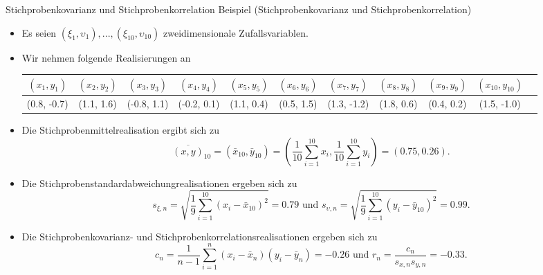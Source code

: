 \documentclass[
  8pt,
  ignorenonframetext,
]{beamer}
\newcommand{\ups}{\upsilon}
\begin{document}
\begin{frame}{Stichprobenkovarianz und Stichprobenkorrelation}
\protect\hypertarget{stichprobenkovarianz-und-stichprobenkorrelation-1}{}
Beispiel (Stichprobenkovarianz und Stichprobenkorrelation) \vspace{1mm}

\footnotesize

\begin{itemize}
\item
  Es seien \((\xi_1,\ups_1),...,(\xi_{10},\ups_{10})\) zweidimensionale
  Zufallsvariablen. \vspace{1mm}
\item
  Wir nehmen folgende Realisierungen an

  \begin{tiny}
  \begin{table}[h]
  \begin{center}
  \setlength{\tabcolsep}{2pt}
  \begin{tabular}{ccccccccccc}
   $(x_1,    y_1)$
  &  $(x_2,    y_2)$
  &  $(x_3,    y_3)$
  &  $(x_4,    y_4)$
  &  $(x_5,    y_5)$
  &  $(x_6,    y_6)$
  &  $(x_7,    y_7)$
  &  $(x_8,    y_8)$
  &  $(x_9,    y_9)$
  &  $(x_{10}, y_{10})$ \\\hline
    (0.8,  -0.7)
  &   (1.1,   1.6)
  &   (-0.8,   1.1)
  &   (-0.2,   0.1)
  &   (1.1,   0.4)
  &   (0.5,   1.5)
  &   (1.3,  -1.2)
  &   (1.8,   0.6)
  &   (0.4,   0.2)
  &   (1.5,  -1.0)
  \end{tabular}
  \end{center}
  \end{table}
  \end{tiny}
\item
  Die Stichprobenmittelrealisation ergibt sich zu \begin{equation}
  \overline{(x,y)}_{10}
  = (\bar{x}_{10},\bar{y}_{10})
  = \left(\frac{1}{10}\sum_{i = 1}^{10}x_i, \frac{1}{10}\sum_{i = 1}^{10}y_i\right)
  = (0.75, 0.26).
  \end{equation}
\item
  Die Stichprobenstandardabweichungrealisationen ergeben sich zu
  \begin{equation}
  s_{\xi,n}
  = \sqrt{\frac{1}{9}\sum_{i=1}^{10} (x_i - \bar{x}_{10})^2}
  = 0.79
  \mbox{ und }
  s_{\ups,n}
  = \sqrt{\frac{1}{9}\sum_{i=1}^{10} (y_i - \bar{y}_{10})^2}
  = 0.99.
  \end{equation}
\item
  Die Stichprobenkovarianz- und Stichprobenkorrelationsrealisationen
  ergeben sich zu \begin{equation}
  c_n
  = \frac{1}{n-1}\sum_{i=1}^n (x_i - \bar{x}_n)(y_i - \bar{y}_n)
  = -0.26
  \mbox{ und }
  r_n
  = \frac{c_n}{s_{x,n}s_{y,n}}
  = -0.33.
  \end{equation}
\end{itemize}
\end{frame}
\end{document}
